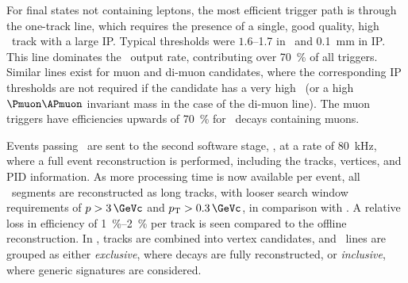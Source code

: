 For final states not containing leptons, the most efficient trigger path is 
through the one-track line, which requires the presence of a single, good 
quality, high \pT\ track with a large \ac{IP}.
Typical thresholds were $1.6$--\SI{1.7}{\GeVc} in \pT\ and 
\SI{0.1}{\milli\metre} in \ac{IP}.
This line dominates the \hltone\ output rate, contributing over 
\SI{70}{\percent} of all triggers.
Similar lines exist for muon and di-muon candidates, where the corresponding 
\ac{IP} thresholds are not required if the candidate has a very high \pT\ (or a 
high $\Pmuon\APmuon$ invariant mass in the case of the di-muon line).
The muon triggers have efficiencies upwards of \SI{70}{\percent} for \PB\ 
decays containing muons.

Events passing \hltone\ are sent to the second software stage, \hlttwo, at a 
rate of \SI{80}{\kilo\hertz}, where a full event reconstruction is performed, 
including the tracks, vertices, and \ac{PID} information.
As more processing time is now available per event, all \velo\ segments are 
reconstructed as long tracks, with looser search window requirements of $\ptot 
> \SI{3}{\GeVc}$ and $\pT > \SI{0.3}{\GeVc}$, in comparison with \hltone.
A relative loss in efficiency of \SIrange{1}{2}{\percent} per track is seen 
compared to the offline reconstruction.
In \hlttwo, tracks are combined into vertex candidates, and \hlttwo\ lines are 
grouped as either \emph{exclusive}, where decays are fully reconstructed, or 
\emph{inclusive}, where generic signatures are considered.

